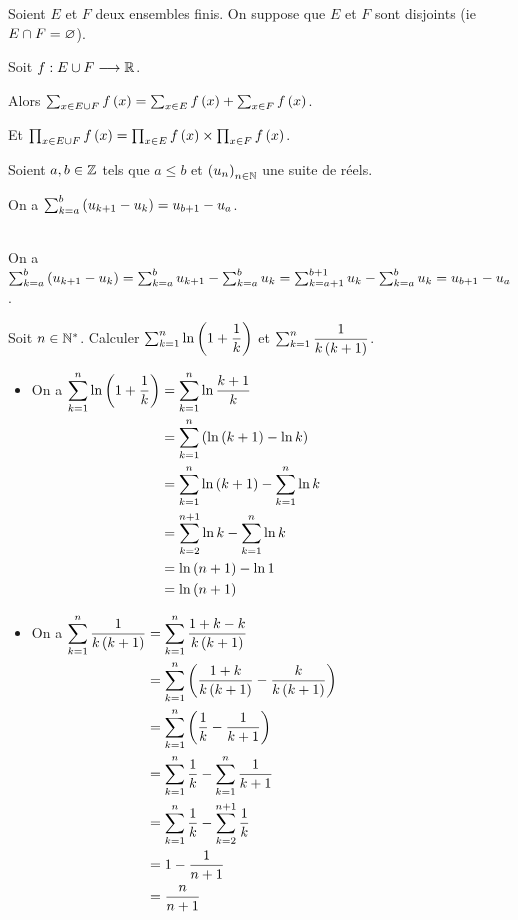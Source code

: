 \begin{prop}
Soient \(E\) et \(F\) deux ensembles finis. On suppose que \(E\) et \(F\) sont disjoints (ie \(E\cap F=\varnothing\)).

Soit \(f:E\cup F\longrightarrow\mathbb{R}\).

Alors \(\sum_{x\in E\cup F}f\left(x\right)=\sum_{x\in E}f\left(x\right)+\sum_{x\in F}f\left(x\right)\).

Et \(\prod_{x\in E\cup F}f\left(x\right)=\prod_{x\in E}f\left(x\right)\times\prod_{x\in F}f\left(x\right)\).
\end{prop}

\begin{prop}
Soient \(a,b\in\mathbb{Z}\) tels que \(a\leq b\) et \(\left(u_n\right)_{n\in\mathbb{N}}\) une suite de réels.

On a \(\sum_{k=a}^b\left(u_{k+1}-u_k\right)=u_{b+1}-u_a\).
\end{prop}

\begin{dem}~\\
On a \(\sum_{k=a}^b\left(u_{k+1}-u_k\right)=\sum_{k=a}^b u_{k+1}-\sum_{k=a}^b u_k=\sum_{k=a+1}^{b+1}u_k-\sum_{k=a}^b u_k=u_{b+1}-u_a\).
\end{dem}

\begin{ex}
Soit \(n\in\mathbb{N}^*\). Calculer \(\sum_{k=1}^n\ln\left(1+\dfrac{1}{k}\right)\) et \(\sum_{k=1}^n\dfrac{1}{k\left(k+1\right)}\).

\begin{itemize}
\item On a \(\begin{aligned}[t]
\sum_{k=1}^n\ln\left(1+\dfrac{1}{k}\right)&=\sum_{k=1}^n\ln\dfrac{k+1}{k} \\
&=\sum_{k=1}^n\left(\ln\left(k+1\right)-\ln k\right) \\
&=\sum_{k=1}^n\ln\left(k+1\right)-\sum_{k=1}^n\ln k \\
&=\sum_{k=2}^{n+1}\ln k-\sum_{k=1}^n\ln k \\
&=\ln\left(n+1\right)-\ln1 \\
&=\ln\left(n+1\right)
\end{aligned}\)

\item On a \(\begin{aligned}[t]
\sum_{k=1}^n\dfrac{1}{k\left(k+1\right)}&=\sum_{k=1}^n\dfrac{1+k-k}{k\left(k+1\right)} \\
&=\sum_{k=1}^n\left(\dfrac{1+k}{k\left(k+1\right)}-\dfrac{k}{k\left(k+1\right)}\right) \\
&=\sum_{k=1}^n\left(\dfrac{1}{k}-\dfrac{1}{k+1}\right) \\
&=\sum_{k=1}^n\dfrac{1}{k}-\sum_{k=1}^n\dfrac{1}{k+1} \\
&=\sum_{k=1}^n\dfrac{1}{k}-\sum_{k=2}^{n+1}\dfrac{1}{k} \\
&=1-\dfrac{1}{n+1} \\
&=\dfrac{n}{n+1}
\end{aligned}\)
\end{itemize}
\end{ex}

